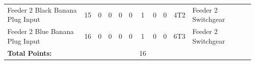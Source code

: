 \begin{table}[!htp]
{\begin{tabular}{lcccccccccll}
			Feeder 2 Black Banana Plug Input    & 15                      & 0                                           & 0                                          & 0           & 0           & 1            & 0                & 0 & 4T2                          & Feeder 2 Switchgear              &                \\
			Feeder 2 Blue Banana Plug Input     & 16                      & 0                                           & 0                                          & 0           & 0           & 1            & 0                & 0 & 6T3                          & Feeder 2 Switchgear              &                \\ \midrule
			\textbf{Total Points:}              &                         &                                             &                                            &             &             & 16           &                  &   &                              &                                  &                \\ \bottomrule
		\end{tabular}
	}
\end{table}
